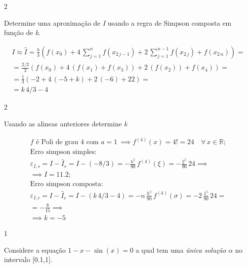 \documentclass[CN_A-Tests_Resolutions.tex]{subfiles}
\begin{document}
\begin{questionBox}2{} %

  Determine uma aproximação de \textit{I} usando a regra de Simpson composta em função de \textit{k}.

  \answer{}

  \begin{gather*}
    I\approx \hat{I}
    = \frac{h}{3}\left(
      f(x_0)
      + 4\,\sum_{j=1}^{n  }{f(x_{2\,j-1})}
      + 2\,\sum_{j=1}^{n-1}{f(x_{2\,j  })}
      + f(x_{2\,n})
    \right)
    = \\
    = \frac{2/2}{3}\left(
      f(x_0)
      + 4\,(f(x_1)+f(x_3))
      + 2\,(f(x_2))
      + f(x_{4})
    \right)
    = \\
    = \frac{1}{3}\left(
      -2
      + 4\,(-5+k)
      + 2\,(-6)
      + 22
    \right)
    = \\
    = k\,4/3-4
  \end{gather*}
\end{questionBox}

\begin{questionBox}2{} %

  Usando as alineas anteriores determine \textit{k}

  \answer{}

  \begin{gather*}
    f \text{ é Poli de grau 4 com } a=1\
    \implies
    f^{(4)}(x)=4! =24\quad\forall\,x\in\mathbb{R}
    ; \\[1ex]
    \text{Erro simpson simples:} \\
    \varepsilon_{I,s}
    = I-\hat{I}_s
    = I-(-8/3)
    = -\frac{h^5}{90}\,f^{(4)}(\xi)
    = -\frac{2^5}{90}\,24
    \implies \\
    \implies
    I = 11.2
    ; \\[1ex]
    \text{Erro simpson composta:} \\
    \varepsilon_{I,c}
    = I-\hat{I}_c
    = I-(k\,4/3-4)
    = -n\,\frac{h^5}{90}\,f^{(4)}(\sigma)
    = -2\,\frac{1^5}{90}\,24
    = \\
    = -\frac{8}{15}
    \implies \\
    \implies 
    k
    = -5
  \end{gather*}

\end{questionBox}

\begin{questionBox}1{} %

  Considere a equação \(1-x-\sin(x)=0\) a qual tem uma \emph{única solução} \(
  \alpha\) no intervalo {[0.1,1]}.
  
\end{questionBox}
\end{document}

